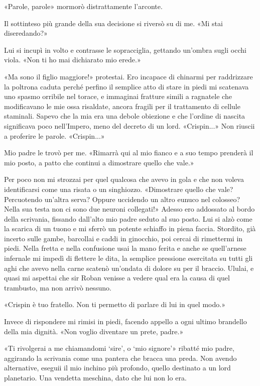 «Parole, parole» mormorò distrattamente l'arconte.

Il sottinteso più grande della sua decisione si riversò su di me. «Mi
stai diseredando?»

Lui si incupì in volto e contrasse le sopracciglia, gettando un'ombra
sugli occhi viola. «Non ti ho mai dichiarato mio erede.»

«Ma sono il figlio maggiore!» protestai. Ero incapace di chinarmi per
raddrizzare la poltrona caduta perché perfino il semplice atto di stare
in piedi mi scatenava uno spasmo orribile nel torace, e immaginai
fratture simili a ragnatele che modificavano le mie ossa risaldate,
ancora fragili per il trattamento di cellule staminali. Sapevo che la
mia era una debole obiezione e che l'ordine di nascita significava poco
nell'Impero, meno del decreto di un lord. «Crispin...» Non riuscii a
proferire le parole. «Crispin...»

Mio padre le trovò per me. «Rimarrà qui al mio fianco e a suo tempo
prenderà il mio posto, a patto che continui a dimostrare quello che
vale.»

Per poco non mi strozzai per quel qualcosa che avevo in gola e che non
voleva identificarsi come una risata o un singhiozzo. «Dimostrare quello
che vale? Percuotendo un'altra serva? Oppure uccidendo un altro eunuco
nel colosseo? Nella sua testa non ci sono due neuroni collegati!» Adesso
ero addossato al bordo della scrivania, fissando dall'alto mio padre
seduto al suo posto. Lui si alzò come la scarica di un tuono e mi sferrò
un potente schiaffo in piena faccia. Stordito, già incerto sulle gambe,
barcollai e caddi in ginocchio, poi cercai di rimettermi in piedi. Nella
fretta e nella confusione usai la mano ferita e anche se quell'arnese
infernale mi impedì di flettere le dita, la semplice pressione
esercitata su tutti gli aghi che avevo nella carne scatenò un'ondata di
dolore su per il braccio. Ululai, e quasi mi aspettai che sir Roban
venisse a vedere qual era la causa di quel trambusto, ma non arrivò
nessuno.

«Crispin è tuo fratello. Non ti permetto di parlare di lui in quel
modo.»

Invece di rispondere mi rimisi in piedi, facendo appello a ogni ultimo
brandello della mia dignità. «Non voglio diventare un prete, padre.»

«Ti rivolgerai a me chiamandomi `sire', o `mio signore'» ribatté mio
padre, aggirando la scrivania come una pantera che bracca una preda. Non
avendo alternative, eseguii il mio inchino più profondo, quello
destinato a un lord planetario. Una vendetta meschina, dato che lui non
lo era.

